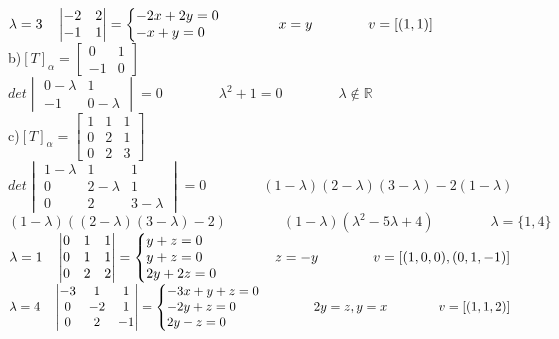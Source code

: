\documentclass[12pt]{article}
\begin{document}
$\lambda=3\quad\begin{vmatrix}-2&2\\-1&1\end{vmatrix}=\left\{\begin{array}{@{}l@{}}-2x+2y=0\\-x+y=0\end{array}\right.\qquad\qquad x=y\qquad\qquad v=[(1,1)]$\\

\noindent b)\quad$[T]_{\alpha}=\begin{bmatrix}0&1\\-1&0\end{bmatrix}$\\

$det\begin{vmatrix}0-\lambda&1\\-1&0-\lambda\end{vmatrix}=0\qquad\qquad\lambda^{2}+1=0\qquad\qquad\lambda\notin\mathds{R}$\\

\noindent c)\quad$[T]_{\alpha}=\begin{bmatrix}1&1&1\\0&2&1\\0&2&3\end{bmatrix}$\\

$det\begin{vmatrix}1-\lambda&1&1\\0&2-\lambda&1\\0&2&3-\lambda\end{vmatrix}=0\qquad\qquad(1-\lambda)(2-\lambda)(3-\lambda)-2(1-\lambda)$\\

$(1-\lambda)((2-\lambda)(3-\lambda)-2)\qquad\qquad(1-\lambda)(\lambda^{2}-5\lambda+4)\qquad\qquad\lambda=\lbrace1,4\rbrace$\\

$\lambda=1\quad\begin{vmatrix}0&1&1\\0&1&1\\0&2&2\end{vmatrix}=\left\{\begin{array}{@{}l@{}}y+z=0\\y+z=0\\2y+2z=0\end{array}\right.\qquad\qquad z=-y\qquad\qquad v=[(1,0,0),(0,1,-1)]$\\

$\lambda=4\quad\begin{vmatrix}-3&1&1\\0&-2&1\\0&2&-1\end{vmatrix}=\left\{\begin{array}{@{}l@{}}-3x+y+z=0\\-2y+z=0\\2y-z=0\end{array}\right.\qquad\qquad 2y=z, y=x\qquad\qquad v=[(1,1,2)]$\\
\end{document}

